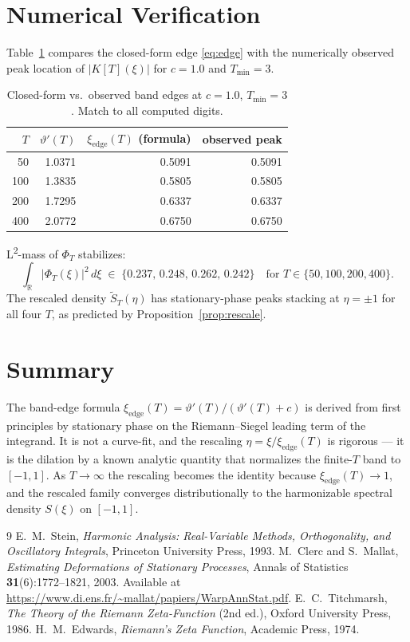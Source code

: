 \documentclass[11pt,a4paper]{article}
\theoremstyle{plain}
\theoremstyle{definition}
\newcommand{\R}{\mathbb{R}}
\begin{document}
\section{Numerical Verification}

Table~\ref{tab:edges} compares the closed-form edge \eqref{eq:edge} with the numerically observed peak location of $|K[T](\xi)|$ for $c=1.0$ and $T_{\min}=3$.

\begin{table}[h]
\centering
\begin{tabular}{rrrr}
\toprule
$T$ & $\vartheta'(T)$ & $\xi_{\mathrm{edge}}(T)$ (formula) & observed peak \\
\midrule
50  & 1.0371 & 0.5091 & 0.5091 \\
100 & 1.3835 & 0.5805 & 0.5805 \\
200 & 1.7295 & 0.6337 & 0.6337 \\
400 & 2.0772 & 0.6750 & 0.6750 \\
\bottomrule
\end{tabular}
\caption{Closed-form vs.\ observed band edges at $c=1.0$, $T_{\min}=3$. Match to all computed digits.}\label{tab:edges}
\end{table}

L\textsuperscript{2}-mass of $\Phi_T$ stabilizes:
\[
\int_\R |\Phi_T(\xi)|^2\,d\xi \;\in\; \{0.237,\,0.248,\,0.262,\,0.242\}\quad\text{for }T\in\{50,100,200,400\} .
\]
The rescaled density $\widetilde{S}_T(\eta)$ has stationary-phase peaks stacking at $\eta=\pm 1$ for all four $T$, as predicted by Proposition~\ref{prop:rescale}.

\section{Summary}

The band-edge formula $\xi_{\mathrm{edge}}(T)=\vartheta'(T)/(\vartheta'(T)+c)$ is derived from first principles by stationary phase on the Riemann--Siegel leading term of the integrand. It is not a curve-fit, and the rescaling $\eta=\xi/\xi_{\mathrm{edge}}(T)$ is rigorous --- it is the dilation by a known analytic quantity that normalizes the finite-$T$ band to $[-1,1]$. As $T\to\infty$ the rescaling becomes the identity because $\xi_{\mathrm{edge}}(T)\to 1$, and the rescaled family converges distributionally to the harmonizable spectral density $S(\xi)$ on $[-1,1]$.

\begin{thebibliography}{9}
 E.~M.~Stein, \emph{Harmonic Analysis: Real-Variable Methods, Orthogonality, and Oscillatory Integrals}, Princeton University Press, 1993.
 M.~Clerc and S.~Mallat, \emph{Estimating Deformations of Stationary Processes}, Annals of Statistics \textbf{31}(6):1772--1821, 2003. Available at \url{https://www.di.ens.fr/~mallat/papiers/WarpAnnStat.pdf}.
 E.~C.~Titchmarsh, \emph{The Theory of the Riemann Zeta-Function} (2nd ed.), Oxford University Press, 1986.
 H.~M.~Edwards, \emph{Riemann's Zeta Function}, Academic Press, 1974.
\end{thebibliography}
\end{document}
